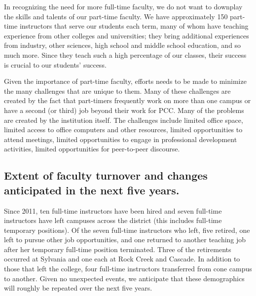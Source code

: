 In recognizing the need for more full-time faculty, we do not want to downplay
the skills and talents of our part-time faculty.  We have approximately 150
part-time instructors that serve our students each term, many of whom have
teaching experience from other colleges and universities; they bring additional
experiences from industry, other sciences, high school and middle school
education, and so much more.  Since they teach such a high percentage of our
classes, their success is crucial to our students' success.

Given the importance of part-time faculty, efforts needs to be made to minimize the many challenges that are unique to them.  Many of these challenges are created by the fact that part-timers frequently work on more than one campus or have a second (or third) job beyond their work for PCC.  Many of the problems are created by the institution itself.  The challenges include limited office space, limited access to office computers and other resources, limited opportunities to attend meetings, limited opportunities to engage in professional development activities, limited opportunities for peer-to-peer discourse.   




\subsection[Faculty turnover]{Extent of faculty turnover and changes anticipated in the next five
years.} 
Since 2011, ten full-time instructors have been hired and seven full-time
instructors have left campuses across the district (this includes full-time 
temporary positions).  Of the seven full-time
instructors who left, five retired, one left to pursue other job opportunities,
and one returned to another teaching job after her temporary full-time position terminated.  Three of the retirements occurred at Sylvania and one each at Rock
Creek and Cascade.  In addition to those that left the college, four full-time instructors transferred from cone campus to another.   Given no unexpected events, we anticipate that these demographics will roughly be repeated over the next five years.


